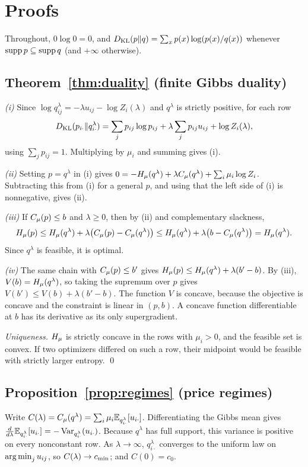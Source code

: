 \section{Proofs}\label{app:proofs}

Throughout, \(0\log0=0\), and \(D_{\mathrm{KL}}(p\|q)=\sum_xp(x)\log(p(x)/q(x))\) whenever \(\operatorname{supp} p\subseteq\operatorname{supp} q\) (and \(+\infty\) otherwise).

\subsection{Theorem~\ref{thm:duality} (finite Gibbs duality)}

\emph{(i)} Since \(\log q^\lambda_{ij}=-\lambda u_{ij}-\log Z_i(\lambda)\) and \(q^\lambda\) is strictly positive, for each row
\[
D_{\mathrm{KL}}(p_{i\cdot}\|q^\lambda_{i\cdot})=\sum_jp_{ij}\log p_{ij}+\lambda\sum_jp_{ij}u_{ij}+\log Z_i(\lambda),
\]
using \(\sum_jp_{ij}=1\). Multiplying by \(\mu_i\) and summing gives (i).

\emph{(ii)} Setting \(p=q^\lambda\) in (i) gives \(0=-H_{\mu}(q^\lambda)+\lambda C_{\mu}(q^\lambda)+\sum_i\mu_i\log Z_i\). Subtracting this from (i) for a general \(p\), and using that the left side of (i) is nonnegative, gives (ii).

\emph{(iii)} If \(C_{\mu}(p)\le b\) and \(\lambda\ge0\), then by (ii) and complementary slackness,
\[
H_{\mu}(p)\le H_{\mu}(q^\lambda)+\lambda\big(C_{\mu}(p)-C_{\mu}(q^\lambda)\big)\le H_{\mu}(q^\lambda)+\lambda\big(b-C_{\mu}(q^\lambda)\big)=H_{\mu}(q^\lambda).
\]
Since \(q^\lambda\) is feasible, it is optimal.

\emph{(iv)} The same chain with \(C_{\mu}(p)\le b'\) gives \(H_{\mu}(p)\le H_{\mu}(q^\lambda)+\lambda(b'-b)\). By (iii), \(V(b)=H_{\mu}(q^\lambda)\), so taking the supremum over \(p\) gives \(V(b')\le V(b)+\lambda(b'-b)\). The function \(V\) is concave, because the objective is concave and the constraint is linear in \((p,b)\). A concave function differentiable at \(b\) has its derivative as its only supergradient.

\emph{Uniqueness.} \(H_{\mu}\) is strictly concave in the rows with \(\mu_i>0\), and the feasible set is convex. If two optimizers differed on such a row, their midpoint would be feasible with strictly larger entropy. \qed

\subsection{Proposition~\ref{prop:regimes} (price regimes)}

Write \(C(\lambda)=C_{\mu}(q^\lambda)=\sum_i\mu_i\mathbb{E}_{q^\lambda_{i\cdot}}[u_{i\cdot}]\). Differentiating the Gibbs mean gives \(\tfrac{d}{d\lambda}\mathbb{E}_{q^\lambda_{i\cdot}}[u_{i\cdot}]=-\operatorname{Var}_{q^\lambda_{i\cdot}}(u_{i\cdot})\). Because \(q^\lambda\) has full support, this variance is positive on every nonconstant row. As \(\lambda\to\infty\), \(q^\lambda_{i\cdot}\) converges to the uniform law on \(\operatorname*{arg\,min}_ju_{ij}\), so \(C(\lambda)\to c_{\min}\); and \(C(0)=c_0\).

